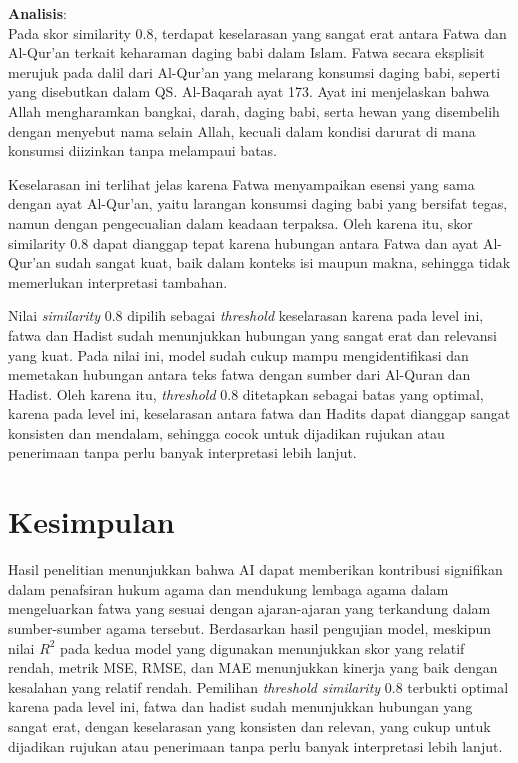 \documentclass[12pt,a4paper]{article}
\begin{document}
\begin{itemize}
        \textbf{Analisis}: \\
        Pada skor similarity 0.8, terdapat keselarasan yang sangat erat antara Fatwa dan Al-Qur'an terkait keharaman daging babi dalam Islam. Fatwa secara eksplisit merujuk pada dalil dari Al-Qur'an yang melarang konsumsi daging babi, seperti yang disebutkan dalam QS. Al-Baqarah ayat 173. Ayat ini menjelaskan bahwa Allah mengharamkan bangkai, darah, daging babi, serta hewan yang disembelih dengan menyebut nama selain Allah, kecuali dalam kondisi darurat di mana konsumsi diizinkan tanpa melampaui batas.

        Keselarasan ini terlihat jelas karena Fatwa menyampaikan esensi yang sama dengan ayat Al-Qur'an, yaitu larangan konsumsi daging babi yang bersifat tegas, namun dengan pengecualian dalam keadaan terpaksa. Oleh karena itu, skor similarity 0.8 dapat dianggap tepat karena hubungan antara Fatwa dan ayat Al-Qur'an sudah sangat kuat, baik dalam konteks isi maupun makna, sehingga tidak memerlukan interpretasi tambahan.
\end{itemize}

Nilai \textit{similarity} 0.8 dipilih sebagai \textit{threshold} keselarasan karena pada level ini, fatwa dan Hadist sudah menunjukkan hubungan yang sangat erat dan relevansi yang kuat. Pada nilai ini, model sudah cukup mampu mengidentifikasi dan memetakan hubungan antara teks fatwa dengan sumber dari Al-Quran dan Hadist. Oleh karena itu, \textit{threshold} 0.8 ditetapkan sebagai batas yang optimal, karena pada level ini, keselarasan antara fatwa dan Hadits dapat dianggap sangat konsisten dan mendalam, sehingga cocok untuk dijadikan rujukan atau penerimaan tanpa perlu banyak interpretasi lebih lanjut.

\section{Kesimpulan}
Hasil penelitian menunjukkan bahwa AI dapat memberikan kontribusi signifikan dalam penafsiran hukum agama dan mendukung lembaga agama dalam mengeluarkan fatwa yang sesuai dengan ajaran-ajaran yang terkandung dalam sumber-sumber agama tersebut. Berdasarkan hasil pengujian model, meskipun nilai $R^2$ pada kedua model yang digunakan menunjukkan skor yang relatif rendah, metrik MSE, RMSE, dan MAE menunjukkan kinerja yang baik dengan kesalahan yang relatif rendah. Pemilihan \textit{threshold similarity} 0.8 terbukti optimal karena pada level ini, fatwa dan hadist sudah menunjukkan hubungan yang sangat erat, dengan keselarasan yang konsisten dan relevan, yang cukup untuk dijadikan rujukan atau penerimaan tanpa perlu banyak interpretasi lebih lanjut.
\end{document}
